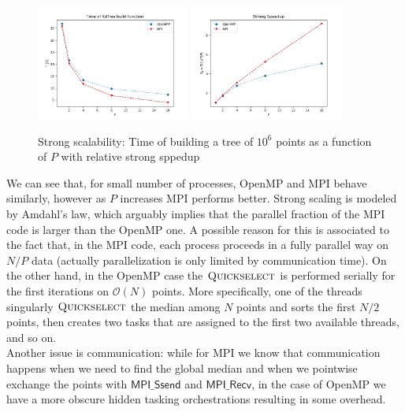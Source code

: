 \documentclass[amssymb, aps,nofootinbib, superscriptaddress, notitlepage]{revtex4}
\begin{document}
\begin{figure}
  \centering
      \includegraphics[width=0.45\textwidth]{img/Strong_time.png}
      \includegraphics[width=0.45\textwidth]{img/Strong_speedup.png}
 \caption{Strong scalability: Time of building a tree of $10^6$ points as a function of $P$ with relative strong sppedup}
\label{Strong}
\end{figure}

We can see that, for small number of processes, OpenMP and MPI behave similarly, however as $P$ increases MPI performs better. Strong scaling is modeled by Amdahl's law, which arguably implies that the parallel fraction of the MPI code is larger than the OpenMP one. A possible reason for this is associated to the fact that, in the MPI code, each process proceeds in a fully parallel way on $N/P$ data (actually parallelization is only limited by communication time).
On the other hand, in the OpenMP case the $\textsc{Quickselect}$ is performed serially for the first iterations on $\mathcal{O}( N)$ points.  More specifically, one of the threads singularly $\textsc{Quickselect}$  the median among $N$ points and sorts the first $N/2$ points, then creates two tasks that are assigned to the first two available threads, and so on.
\\
Another issue is communication: while for MPI we know that communication happens when we need to find the global median and  when we pointwise exchange the points with $\textsf{MPI\_Ssend}$ and $\textsf{MPI\_Recv}$,  in the case of OpenMP we have a more obscure  hidden tasking orchestrations resulting in some overhead.\\
\end{document}

